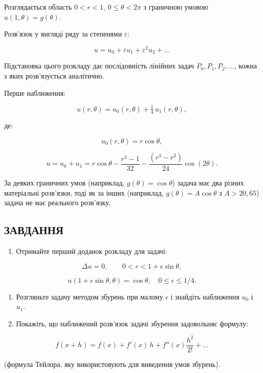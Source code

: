 \documentclass[
  ukrainian,
]{article}
\providecommand{\tightlist}{%
  \setlength{\itemsep}{0pt}\setlength{\parskip}{0pt}}
\begin{document}
Розглядається область \(0 < r < 1\), \(0 \le \theta < 2\pi\) з граничною
умовою \(u(1,\theta) = g(\theta)\).

Розв'язок у вигляді ряду за степенями \(\varepsilon\):

\[u = u_0 + \varepsilon u_1 + \varepsilon^2 u_2 + \dots\]

Підстановка цього розкладу дає послідовність лінійних задач
\(P_0, P_1, P_2, \ldots\), кожна з яких розв'язується аналітично.

Перше наближення:

\[u(r,\theta) = u_0(r,\theta) + \tfrac{1}{4}\,u_1(r,\theta),\]

де:

\[u_0(r,\theta) = r\cos\theta,\]

\[u = u_0 + u_1 = r\cos\theta - \frac{r^4-1}{32} - \frac{(r^4-r^2)}{24}\cos(2\theta).\]

За деяких граничних умов (наприклад, \(g(\theta) = \cos\theta\)) задача
має два різних матеріальні розв'язки, тоді як за інших (наприклад,
\(g(\theta) = A\cos\theta\) з \(A > 20{,}65\)) задача не має реального
розв'язку.

\subsection{ЗАВДАННЯ}\label{ux437ux430ux432ux434ux430ux43dux43dux44f-27}

\begin{enumerate}
\def\labelenumi{\arabic{enumi}.}
\tightlist
\item
  Отримайте перший доданок розкладу для задачі:
\end{enumerate}

\[\Delta u = 0, \qquad 0 < r < 1 + \epsilon\sin\theta,\]

\[u(1+\epsilon\sin\theta, \theta) = \cos\theta, \quad 0 \le \epsilon \le 1/4.\]

\begin{enumerate}
\def\labelenumi{\arabic{enumi}.}
\setcounter{enumi}{1}
\item
  Розгляньте задачу методом збурень при малому \(\epsilon\) і знайдіть
  наближення \(u_0\) і \(u_1\).
\item
  Покажіть, що наближений розв'язок задачі збурення задовольняє формулу:
\end{enumerate}

\[f(x+h) = f(x) + f'(x)\,h + f''(x)\frac{h^2}{2!} + \dots\]

(формула Тейлора, яку використовують для виведення умов збурень).
\end{document}
